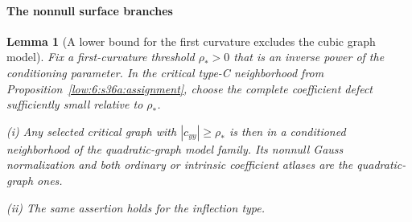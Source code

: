 \documentclass[11pt]{amsart}
\newtheorem{lemma}[theorem]{Lemma}
\theoremstyle{definition}
\theoremstyle{remark}
\numberwithin{equation}{section}
\begin{document}
\paragraph{The nonnull surface branches}
\begin{lemma}[A lower bound for the first curvature excludes the cubic graph model]\label{low:6:s36i:nonnull-model}
Fix a first-curvature threshold $\rho_*>0$ that is an inverse power of the conditioning parameter. In the critical type-C neighborhood from Proposition~\ref{low:6:s36a:assignment}, choose the complete coefficient defect sufficiently small relative to $\rho_*$.

\noindent\textup{(i)} Any selected critical graph with $|c_{yy}|\ge\rho_*$ is then in a conditioned neighborhood of the quadratic-graph model family. Its nonnull Gauss normalization and both ordinary or intrinsic coefficient atlases are the quadratic-graph ones.

\noindent\textup{(ii)} The same assertion holds for the inflection type.
\end{lemma}
\end{document}

